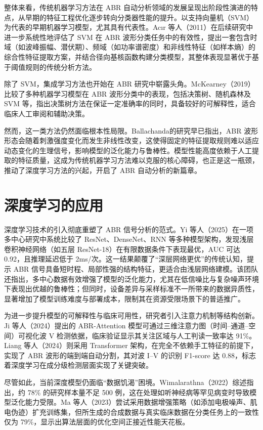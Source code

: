 整体来看，传统机器学习方法在 ABR 自动分析领域的发展呈现出阶段性演进的特点，从早期的特征工程优化逐步转向分类器性能的提升。以支持向量机（SVM）为代表的早期机器学习模型，尤其具有代表性。Acır 等人（2011）\cite{Acir2013}在后续研究中进一步系统性地评估了 SVM 在 ABR 波形分类任务中的有效性，提出一套包含时域（如波峰振幅、潜伏期）、频域（如功率谱密度）和非线性特征（如样本熵）的综合性特征提取方案，并结合径向基核函数构建分类模型，其整体表现显著优于基于阈值规则的传统分析方法。

除了 SVM，集成学习方法也开始在 ABR 研究中崭露头角。McKearney（2019）比较了多种机器学习模型在 ABR 波形分类中的表现，包括决策树、随机森林及 SVM 等，指出决策树方法在保证一定准确率的同时，具备较好的可解释性，适合临床人工审阅和辅助决策。

然而，这一类方法仍然面临根本性局限。Ballachanda\cite{ballachanda1992adaptation}的研究早已指出，ABR 波形形态会随着刺激强度变化而发生非线性改变，这使得固定的特征提取规则难以适应动态变化的生理信号，影响模型的泛化能力与鲁棒性。模型性能高度依赖于人工提取的特征质量，这成为传统机器学习方法难以克服的核心障碍，也正是这一瓶颈，推动了深度学习方法的兴起，开启了 ABR 自动分析的新篇章。


\section{深度学习的应用}
深度学习技术的引入彻底重塑了 ABR 信号分析的范式。Yi 等人（2025）\cite{liu2025comparison}在一项多中心研究中系统比较了 ResNet、DenseNet、RNN 等多种模型架构，发现浅层卷积神经网络（如五层 ResNet-18）在有限数据条件下表现最优，AUC 可达 0.92，且推理延迟低于 2ms/次。这一结果颠覆了“深层网络更优”的传统认知，提示 ABR 信号具备短时程、局部性强的结构特征，更适合由浅层网络建模。该团队还指出，多中心数据有效增强了模型的泛化能力，尤其在低信噪比与复杂噪声环境下表现出优越的鲁棒性；但同时，设备差异与采样标准不一所带来的数据异质性，显著增加了模型训练难度与部署成本，限制其在资源受限场景下的普适推广。

为进一步提升模型的可解释性与临床可用性，研究者引入注意力机制等结构创新。Ji 等人（2024）\cite{ji2024abr}提出的 ABR-Attention 模型可通过三维注意力图（时间–通道–空间）可视化波 V 检测依据，临床验证显示其关注区域与人工判读一致率达 91\%。Liang 等人（2024）\cite{liang2024automatic}则采用 Transformer 架构，在完全不依赖手工特征的前提下，实现了 ABR 波形的端到端自动分割，其对波 I–V 的识别 F1-score 达 0.88，标志着深度学习在成分级检测层面实现了关键突破。

尽管如此，当前深度模型仍面临“数据饥渴”困境。Wimalarathna（2022）\cite{wimalarathna2022machine}综述指出，约 78\% 的研究样本量不足 500 例，这在处理如听神经病等罕见病变时导致模型泛化能力受限。Ma 等人（2023）\cite{ma2023auditory}尝试采用数据增强策略（如添加电极噪声、肌电伪迹）扩充训练集，但所生成的合成数据与真实临床数据在分类任务上的一致性仅为 79\%，显示出算法层面的优化空间正接近性能天花板。

